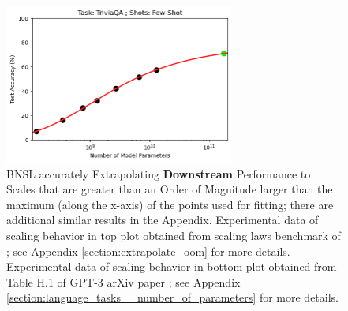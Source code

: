 \documentclass{article} %
\begin{document}
\begin{figure}[h]
\hspace{5.7mm}\includegraphics[width=0.6732\textwidth]{figures/gpt-3__parameter_scaling/TriviaQA___Few-Shot.png}
\vspace{-3.55mm}
    \caption{
    BNSL accurately Extrapolating \textbf{Downstream} Performance to Scales that are greater than an Order of Magnitude larger than the maximum (along the x-axis) of the points used for fitting; there are additional similar results in the Appendix. Experimental data of scaling behavior in top plot obtained from scaling laws benchmark of \cite{Alabdulmohsi2022revisiting}; see Appendix \ref{section:extrapolate_oom} for more details. Experimental data of scaling behavior in bottom plot obtained from Table H.1 of GPT-3 arXiv paper \citep{brown2020language}; see Appendix \ref{section:language_tasks__number_of_parameters} for more details. 
    }
    \label{fig:extrapolate_oom_main_paper}
    \vspace{-1.7mm}
\end{figure}
\end{document}
